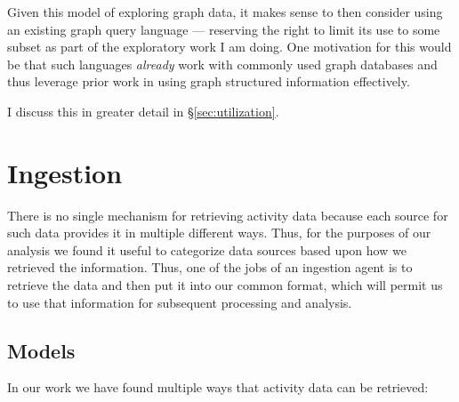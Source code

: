 \documentclass[sigconf,anonymous,review]{acmart}
\begin{document}
Given this model of exploring graph data, it makes sense to then consider using
an existing graph query language --- reserving the right to limit its use to
some subset as part of the exploratory work I am doing.  One motivation for this
would be that such languages \emph{already} work with commonly used graph
databases and thus leverage prior work in using graph structured information
effectively.

I discuss this in greater detail in \S \ref{sec:utilization}.

\section{Ingestion}
\label{sec:ingestion}

There is no single mechanism for retrieving activity data because each source
for such data provides it in multiple different ways.  Thus, for the purposes of
our analysis we found it useful to categorize data sources based upon how we
retrieved the information.  Thus, one of the jobs of an ingestion agent is to
retrieve the data and then put it into our common format, which will permit us
to use that information for subsequent processing and analysis.

\subsection{Models}\label{sec:ingestion:models}

In our work we have found multiple ways that activity data can be retrieved:
\end{document}
